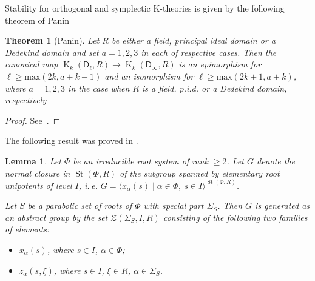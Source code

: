 \documentclass[oneside, 10pt]{amsart}
\newtheorem{theorem}{Theorem}
\newtheorem{lemma}{Lemma}
\theoremstyle{remark}
\theoremstyle{definition}
\DeclareMathOperator{\St}{St}
\DeclareMathOperator{\K}{K}
\newcommand{\rD}{\mathsf{D}}
\numberwithin{equation}{section}
\begin{document}
Stability for orthogonal and symplectic K-theories is given by the following theorem of Panin
\begin{theorem}[Panin] \label{lem:Panin-stability}
 Let $R$ be either a field, principal ideal domain or a Dedekind domain and set $a = 1,2,3$ in each of respective cases.
 Then the canonical map $\K_k(\rD_\ell, R) \to \K_k(\rD_\infty, R)$ is an epimorphism for $\ell \geq \mathrm{max}(2k, a+k-1)$ 
 and an isomorphism for $\ell \geq \mathrm{max}(2k+1, a+k)$, where $a=1,2,3$ in the case when $R$ is a field, p.i.d. or a Dedekind domain, respectively \end{theorem}
\begin{proof} See~\cite[Theorem~9.4]{Pa89}. \end{proof}
 
\begin{comment}
 Stabilization for orthogonal and symplectic K-groups a la Quillen is given by Panin's theorem,  More specifically the bounds for surjective (resp. injective) stability is 
 $\ell \geq \max(6, a+2)$ (resp. $\ell \geq \max(7,a+3)$) for $a=1,2,3$ in the case when $R$ is a field, p.i.d. or a Dedekind domain, respectively.
\end{comment}

The following result was proved in \cite[Proposition~3.2]{Ste13}.
\begin{lemma}\label{lem:Zgen} Let $\Phi$ be an irreducible root system of rank $\geq 2$. 
Let $G$ denote the normal closure in $\St(\Phi, R)$ of the subgroup spanned by elementary root unipotents of level $I$, i.\,e. $G=\langle x_\alpha(s) \mid \alpha\in\Phi,\ s\in I\rangle^{\St(\Phi, R)}$.

Let $S$ be a parabolic set of roots of $\Phi$ with special part $\Sigma_S$. Then $G$ is generated as an abstract group by the set $\mathcal{Z}(\Sigma_S, I, R)$ consisting of the following two families of elements:
\begin{itemize}
 \item $x_{\alpha}(s)$, where $s\in I$, $\alpha\in\Phi$;
 \item $z_\alpha(s,\xi)$, where $s\in I$, $\xi\in R$, $\alpha\in\Sigma_S$.
\end{itemize}        
\end{lemma}

\begin{comment}
Suppose for a moment that $\langle \alpha, \beta \rangle = -1$ and  $\langle \beta, \alpha \rangle = -1$ then
\[ \{s, t^{-1} \} = \{s,  t^{-1}\}_\alpha = \{t, s^{-1} \}_\beta^{-1} = \{s^{-1}, t\} \]
In particular, $\{s, s^{-1}\} = \{s, s^{-1}\}^{-1}$ 
\end{comment}
\end{document}
